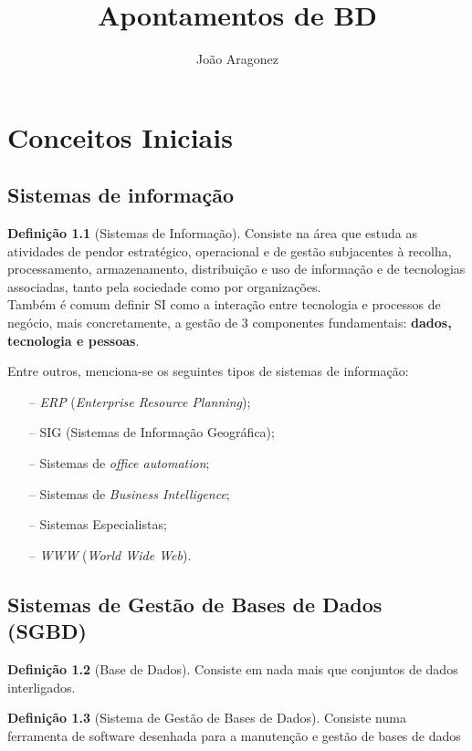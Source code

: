 \documentclass[titlepage]{book}
\title{Apontamentos de BD}
\author{João Aragonez}
\date{}
\theoremstyle{definition}
\newtheorem{definition}{Definição}
\begin{document}
\maketitle
\tableofcontents

\chapter{Conceitos Iniciais}

\section{Sistemas de informação}
\begin{definition}[Sistemas de Informação]
    Consiste na área que estuda as atividades de pendor estratégico, operacional e de gestão subjacentes à recolha, processamento, armazenamento, distribuição e uso de informação e de tecnologias associadas, tanto pela sociedade como por organizações. \\
    \indent Também é comum definir SI como a interação entre tecnologia e processos de negócio, mais concretamente, a gestão de 3 componentes fundamentais: \textbf{dados, tecnologia e pessoas}.
\end{definition}
Entre outros, menciona-se os seguintes tipos de sistemas de informação:
\begin{itemize}
    \itemsep0cm
    \item[--] \textit{ERP} (\textit{Enterprise Resource Planning});
    \item[--] SIG (Sistemas de Informação Geográfica);
    \item[--] Sistemas de \textit{office automation};
    \item[--] Sistemas de \textit{Business Intelligence};
    \item[--] Sistemas Especialistas;
    \item[--] \textit{WWW} (\textit{World Wide Web}).   
\end{itemize}

\section{Sistemas de Gestão de Bases de Dados (SGBD)}

\begin{definition}[Base de Dados]
    Consiste em nada mais que conjuntos de dados interligados.
\end{definition}

\begin{definition}[Sistema de Gestão de Bases de Dados]
    Consiste numa ferramenta de software desenhada para a manutenção e gestão de bases de dados
\end{definition}
\end{document}
